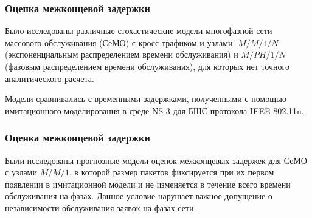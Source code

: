     






\begin{frame}
    \justifying
    \frametitle{Оценка межконцевой задержки}
    \fontsize{8pt}{7.2}\selectfont

    Было исследованы различные стохастические модели многофазной сети массового обслуживания (СеМО) с кросс-трафиком и узлами: $M/M/1/N$ (экспоненциальным распределением времени обслуживания) и $M/PH/1/N$ (фазовым распределением времени обслуживания), для которых нет точного аналитического расчета.


    \bigskip
    Модели сравнивались с временными задержками, полученными с помощью имитационного моделирования в среде NS-3 для БШС протокола IEEE 802.11n.

\end{frame}

\begin{frame}
    \justifying
    \frametitle{Оценка межконцевой задержки}
    \fontsize{8pt}{7.2}\selectfont

    Были исследованы прогнозные модели оценок межконцевых задержек для СеМО с узлами $M/M/1$, в которой размер пакетов фиксируется при их первом появлении в имитационной модели и не изменяется в течение всего времени обслуживания на фазах. Данное условие нарушает важное допущение о независимости обслуживания заявок на фазах сети.



\end{frame}

